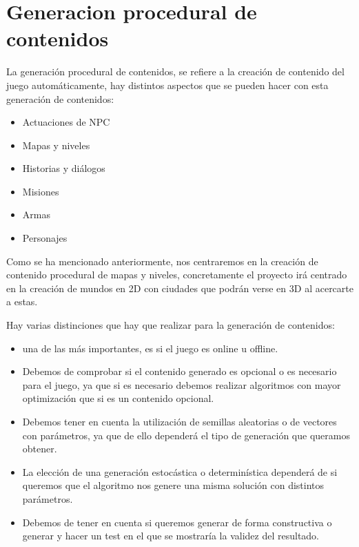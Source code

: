 \chapter[Generacion procedural de contenidos]{\label{identificadorReferenciaCruzada}
Generacion procedural de contenidos}

La generación procedural de contenidos, se refiere a la creación de contenido del juego automáticamente, hay distintos aspectos que se pueden hacer con esta generación de contenidos:

\begin{itemize}
	\item Actuaciones de NPC
	\item Mapas y niveles
	\item Historias y diálogos
	\item Misiones
	\item Armas
	\item Personajes
\end{itemize}


Como se ha mencionado anteriormente, nos centraremos en la creación de contenido procedural de mapas y niveles, concretamente el proyecto irá centrado en la creación de mundos en 2D con ciudades que podrán verse en 3D al acercarte a estas.

Hay varias distinciones que hay que realizar para la generación de contenidos:

\begin{itemize}

\item una de las más importantes, es si el juego es online u offline.

\item Debemos de comprobar si el contenido generado es opcional o es necesario para el juego, ya que si es necesario debemos realizar algoritmos con mayor optimización que si es un contenido opcional.

\item Debemos tener en cuenta la utilización de  semillas aleatorias o de vectores con parámetros, ya que de ello dependerá el tipo de generación que queramos obtener.

\item La elección de una generación estocástica o determinística dependerá de si queremos que el algoritmo nos genere una misma solución con distintos parámetros.

\item Debemos de tener en cuenta si queremos generar de forma constructiva o generar y hacer un test en el que se mostraría la validez del resultado.

\end{itemize}

